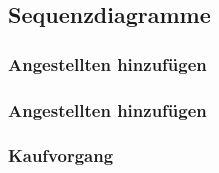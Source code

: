 \documentclass{beamer}
\begin{document}
\subsection{Sequenzdiagramme}
\begin{frame}
\frametitle{Angestellten hinzuf\"ugen}
\end{frame}

\begin{frame}
\frametitle{Angestellten hinzuf\"ugen}
\end{frame}

\begin{frame}
\frametitle{Kaufvorgang}
\end{frame}
\end{document}
